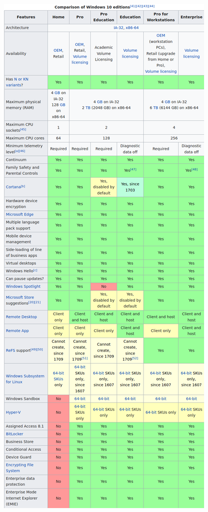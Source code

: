 \documentclass[11pt]{article}
\begin{document}
\begin{center}
\includegraphics[width=.9\linewidth]{./imgs/ediciones-win10-01.png}
\end{center}
\end{document}
